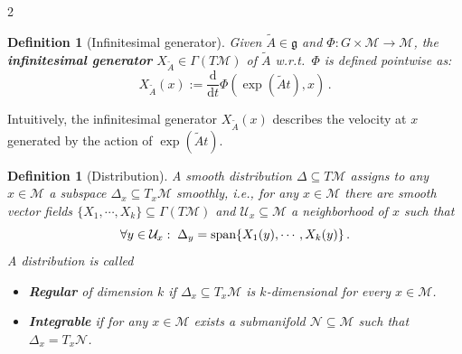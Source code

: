 \documentclass{article}
\newtheorem{definition}[theorem]{Definition}
\newcommand{\M}{\mathcal{M}}                                %
\newcommand{\g}{\mathfrak{g}}                               %
\newcommand{\R}{\mathbb{R}}                                 %
\newcommand{\appX}{\bar{X}}
\newcommand{\state}{x}
\newcommand{\stateb}{y}
\newcommand{\appstate}{\bar{x}}
\newcommand{\ext}{\text{d}}                                 %
\begin{document}
\begin{multicols}{2}


\begin{definition}[Infinitesimal generator]\label{def:infinitesimal_generator}
    Given $\widetilde{A} \in \g$ and $\Phi:G\times\M\rightarrow\M$, the \textbf{infinitesimal generator} $X_{\widetilde{A}} \in \Gamma(T\M)$ of $\widetilde{A}$ w.r.t.\ $\Phi$ is defined pointwise as: 
    \begin{equation}\label{eq:inf_generator}
        X_{\widetilde{A}}(\state) := \frac{\ext}{\ext t} \Phi(\exp(\widetilde{A}t),\state)\,.%
    \end{equation}
\end{definition}
Intuitively, the infinitesimal generator $X_{\widetilde{A}}(\state)$ describes the velocity at $\state$ generated by the action of $\exp(\widetilde{A}t)$. %

\begin{definition}[Distribution]
    A smooth distribution $\Delta \subseteq T\M$ assigns to any $\state\in\M$ a subspace $\Delta_\state \subseteq T_\state\M$ smoothly, i.e., for any $\state \in \M$ there are smooth vector fields $\{X_1,\cdots, X_k\} \subseteq \Gamma(T\M)$ and $\mathcal{U}_\state \subseteq \M$ a neighborhood of $\state$ such that 
    \begin{equation}
        \forall \stateb \in \mathcal{U}_\state:\; \Delta_\stateb = \textnormal{span}\{X_1(\stateb),\cdots, X_k(\stateb)\}\,.
    \end{equation}
    A distribution is called
    \begin{itemize}
        \item \textbf{Regular} of dimension $k$ if $\Delta_\state \subseteq T_\state \M$ is $k$-dimensional for every $\state \in \M$.
        \item \textbf{Integrable} if for any $\state \in \M$ exists a submanifold $\mathcal{N} \subseteq \M$ such that $\Delta_\state = T_\state \mathcal{N}$.
    \end{itemize}
\end{definition}


\end{multicols}
\end{document}
